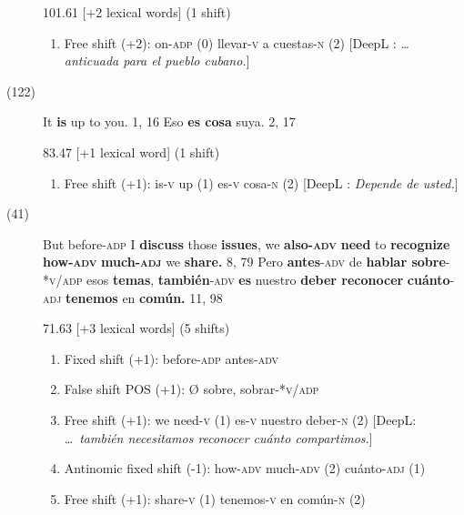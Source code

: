 \documentclass[output=paper]{langsci/langscibook}
\begin{document}
\begin{description}
    101.61 [+2 lexical words] (1 shift)

    \begin{enumerate}
      \item Free shift (+2): on-\textsc{adp} (0) \rightarrow llevar-\textsc{v} a cuestas-\textsc{n} (2) [DeepL : \textit{… anticuada para el pueblo cubano.}]
    \end{enumerate}

  \item[(122)] It \textbf{is} up to you. 1, 16 \rightarrow Eso \textbf{es cosa} suya. 2, 17

    83.47 [+1 lexical word] (1 shift)

    \begin{enumerate}
      \item Free shift (+1): is-\textsc{v} up (1) \rightarrow es-\textsc{v} cosa-\textsc{n} (2) [DeepL : \textit{Depende de usted.}]
    \end{enumerate}

  \item[(41)] But before\textsc{-adp} I \textbf{discuss} those \textbf{issues}, we \textbf{also}\textbf{\textsc{-adv}} \textbf{need} to \textbf{recognize how}\textbf{\textsc{-adv}} \textbf{much}\textbf{\textsc{-adj}} we \textbf{share.} 8, 79 \rightarrow Pero \textbf{antes}\textsc{-adv} de \textbf{hablar sobre}-*\textsc{v/adp} esos \textbf{temas}, \textbf{también}\textsc{-adv} \textbf{es} nuestro \textbf{deber reconocer} \textbf{cuánto}\textsc{-adj} \textbf{tenemos} en \textbf{común.} 11, 98

    71.63 [+3 lexical words] (5 shifts)

    \begin{enumerate}
      \item Fixed shift (+1): before-\textsc{adp} \rightarrow antes-\textsc{adv}
      \item False shift POS (+1): Ø \rightarrow sobre, sobrar-*\textsc{v/adp}
      \item Free shift (+1): we need-\textsc{v} (1) \rightarrow es-\textsc{v} nuestro deber-\textsc{n} (2) [DeepL: \dots\ \textit{también necesitamos reconocer cuánto compartimos.}]
      \item Antinomic fixed shift (-1): how-\textsc{adv} much-\textsc{adv} (2) \rightarrow cuánto-\textsc{adj} (1)
      \item Free shift (+1): share-\textsc{v} (1) \rightarrow tenemos-\textsc{v} en común-\textsc{n (2)}
    \end{enumerate}


\end{description}
\end{document}
